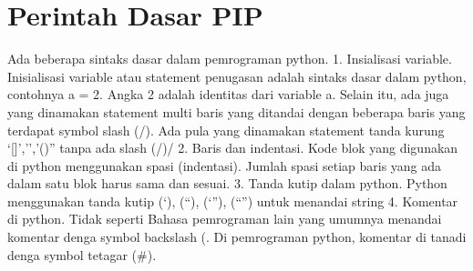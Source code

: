 \documentclass[12pt,a4paper]{article}
\begin{document}
\section{Perintah Dasar PIP}
Ada beberapa sintaks dasar dalam pemrograman python.
1.	Insialisasi variable. Inisialisasi variable atau statement penugasan adalah sintaks dasar dalam python, contohnya a = 2. Angka 2 adalah identitas dari variable a. Selain itu, ada juga yang dinamakan statement multi baris yang ditandai dengan beberapa baris yang terdapat symbol slash (/). Ada pula yang dinamakan statement tanda kurung ‘[]’,’{}’,’()” tanpa ada slash (/)/
2.	Baris dan indentasi. Kode blok yang digunakan di python menggunakan spasi (indentasi). Jumlah spasi setiap baris yang ada dalam satu blok harus sama dan sesuai.
3.	Tanda kutip dalam python. Python menggunakan tanda kutip (‘), (“), (‘”), (“”) untuk menandai string 
4.	Komentar di python. Tidak seperti Bahasa pemrograman lain yang umumnya menandai komentar denga symbol backslash (\). Di pemrograman python, komentar di tanadi denga symbol tetagar (#).
\end{document}
